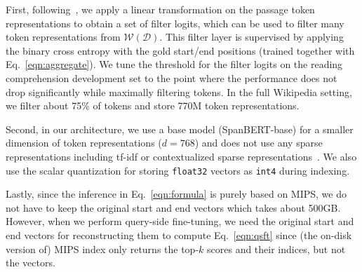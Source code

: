 \documentclass[11pt,a4paper]{article}
\newcommand{\wordset}{\mathcal{W}(\mathcal{D})}
\newcommand\ttt[1]{\texttt{#1}}
\begin{document}
First, following~\citet{seo2019real}, we apply a linear transformation on the passage token representations to obtain a set of filter logits, which can be used to filter many token representations from $\wordset$.
This filter layer is supervised by applying the binary cross entropy with the gold start/end positions (trained together with Eq.~\eqref{eqn:aggregate}).
We tune the threshold for the filter logits on the reading comprehension development set to the point where the performance does not drop significantly while maximally filtering tokens.
In the full Wikipedia setting, we filter about 75\% of tokens and store 770M token representations.

Second, in our architecture, we use a base model (SpanBERT-base) for a smaller dimension of token representations ($d=768$) and does not use any sparse representations including tf-idf or contextualized sparse representations~\citep{lee2020contextualized}.
We also use the scalar quantization for storing \ttt{float32} vectors as \ttt{int4} during indexing.

Lastly, since the inference in Eq.~\eqref{eqn:formula} is purely based on MIPS, we do not have to keep the original start and end vectors which takes about 500GB.
However, when we perform query-side fine-tuning, we need the original start and end vectors for reconstructing them to compute Eq.~\eqref{eqn:qsft} since (the on-disk version of) MIPS index only returns the top-$k$ scores and their indices, but not the vectors.
 
\end{document}
